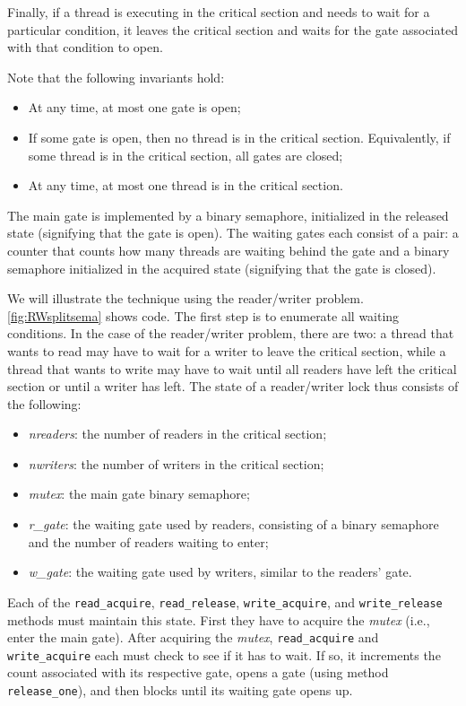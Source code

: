 \documentclass{report}
\begin{document}
Finally, if a thread is executing in the critical section and needs to
wait for a particular condition, it leaves the critical section and waits
for the gate associated with that condition to open.

Note that the following invariants hold:
\begin{itemize}
\item At any time, at most one gate is open;
\item If some gate is open, then no thread is in the critical section.  Equivalently, if some thread is in the critical section, all gates are closed;
\item At any time, at most one thread is in the critical section.
\end{itemize}

The main gate is implemented by a binary semaphore, initialized in the
released state (signifying that the gate is open).
The waiting gates each consist of a pair: a counter that counts how many
threads are waiting behind the gate and a binary semaphore initialized
in the acquired state (signifying that the gate is closed).

We will illustrate the technique using the reader/writer problem.
\autoref{fig:RWsplitsema} shows code.
The first step is to enumerate all waiting conditions.
In the case of the reader/writer
problem, there are two: a thread that wants to read may have to wait for a
writer to leave the critical section, while a thread that wants to write may
have to wait until all readers have left the critical section or until a writer has left.
%
The state of a reader/writer lock thus consists of the following:
\begin{itemize}
\item \textit{nreaders}: the number of readers in the critical section;
\item \textit{nwriters}: the number of writers in the critical section;
\item \textit{mutex}: the main gate binary semaphore;
\item \textit{r\_gate}: the waiting gate used by readers, consisting of a binary semaphore and the number of readers waiting to enter;
\item \textit{w\_gate}: the waiting gate used by writers, similar to the readers' gate.
\end{itemize}

Each of the
\texttt{read\_acquire}, \texttt{read\_release},
\texttt{write\_acquire}, and \texttt{write\_release} methods must maintain
this state.
First they have to acquire the \textit{mutex}
(i.e., enter the main gate).
After acquiring the \textit{mutex},
\texttt{read\_acquire} and \texttt{write\_acquire} each must check to see
if it has to wait.
If so, it increments the count associated with its respective gate,
opens a gate (using method \texttt{release\_one}), and then blocks until
its waiting gate opens up.
\end{document}
